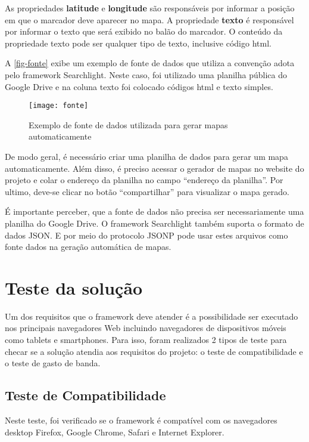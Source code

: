 As propriedades \textbf{latitude} e \textbf{longitude} são responsáveis por informar a posição em que o marcador deve aparecer no mapa. A propriedade \textbf{texto} é responsável por informar o texto que será exibido no balão do marcador. O conteúdo da propriedade texto pode ser qualquer tipo de texto, inclusive código html.

 A \autoref{fig-fonte} exibe um exemplo de fonte de dados que utiliza a convenção adota pelo framework Searchlight. Neste caso, foi utilizado uma planilha pública do Google Drive e na coluna texto foi colocado  códigos html e texto simples. 		
  
 \begin{figure}[htb]
	\caption{\label{fig-fonte}Exemplo de fonte de dados utilizada para gerar mapas automaticamente}
	\begin{center}
	    \texttt{[image: fonte]}
	\end{center}
\end{figure}

De modo geral, é necessário criar uma planilha de dados para  gerar um mapa automaticamente. Além disso, é preciso acessar o gerador de mapas no website do projeto e colar o endereço  da planilha no campo ``endereço da planilha''. Por ultimo, deve-se clicar no botão ``compartilhar'' para visualizar o mapa gerado.

É importante perceber, que a fonte de dados não precisa ser necessariamente uma planilha do Google Drive. O framework Searchlight também suporta o formato de dados JSON. E por meio do protocolo JSONP pode usar estes arquivos como fonte dados na geração automática de mapas.  


\section{Teste da solução}
Um dos requisitos que o framework deve atender é a possibilidade ser executado nos principais navegadores Web incluindo navegadores de dispositivos móveis como tablets e smartphones. Para isso, foram realizados 2 tipos de teste para checar se a solução atendia aos requisitos do projeto: o teste de compatibilidade e o teste de gasto de banda.

\subsection{Teste de Compatibilidade}
Neste teste, foi verificado  se o framework é compatível com os navegadores desktop Firefox, Google Chrome, Safari e Internet Explorer.